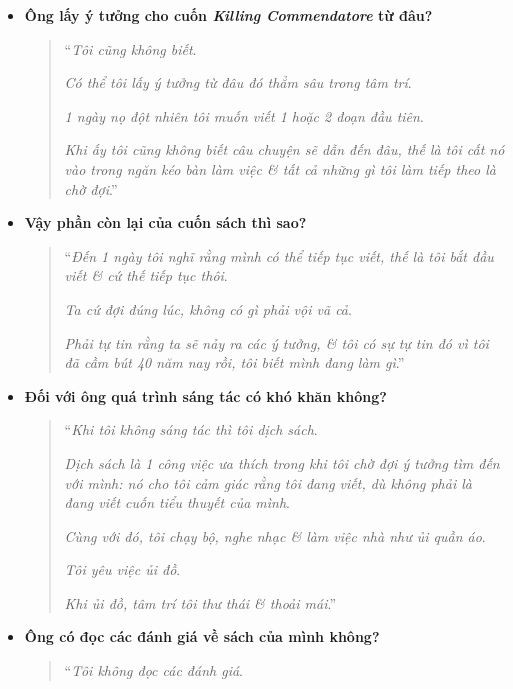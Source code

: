 \documentclass{article}
\begin{document}
\begin{itemize}
	\item \textbf{Ông lấy ý tưởng cho cuốn \textit{Killing Commendatore} từ đâu?}
	
	\begin{quotation}
		``\textit{Tôi cũng không biết}.
		
		\textit{Có thể tôi lấy ý tưởng từ đâu đó thẳm sâu trong tâm trí}.
		
		\textit{1 ngày nọ đột nhiên tôi muốn viết 1 hoặc 2 đoạn đầu tiên}.
		
		\textit{Khi ấy tôi cũng không biết câu chuyện sẽ dẫn đến đâu, thế là tôi cất nó vào trong ngăn kéo bàn làm việc \& tất cả những gì tôi làm tiếp theo là chờ đợi}.''
	\end{quotation}
	
	\item \textbf{Vậy phần còn lại của cuốn sách thì sao?}
	
	\begin{quotation}
		``\textit{Đến 1 ngày tôi nghĩ rằng mình có thể tiếp tục viết, thế là tôi bắt đầu viết \& cứ thế tiếp tục thôi}.
		
		\textit{Ta cứ đợi đúng lúc, không có gì phải vội vã cả}.
		
		\textit{Phải tự tin rằng ta sẽ nảy ra các ý tưởng, \& tôi có sự tự tin đó vì tôi đã cầm bút 40 năm nay rồi, tôi biết mình đang làm gì}.''
	\end{quotation}
	
	\item \textbf{Đối với ông quá trình sáng tác có khó khăn không?}
	\begin{quotation}
		``\textit{Khi tôi không sáng tác thì tôi dịch sách}.
		
		\textit{Dịch sách là 1 công việc ưa thích trong khi tôi chờ đợi ý tưởng tìm đến với mình: nó cho tôi cảm giác rằng tôi đang viết, dù không phải là đang viết cuốn tiểu thuyết của mình}.
		
		\textit{Cùng với đó, tôi chạy bộ, nghe nhạc \& làm việc nhà như ủi quần áo}.
		
		\textit{Tôi yêu việc ủi đồ}.
		
		\textit{Khi ủi đồ, tâm trí tôi thư thái \& thoải mái}.''
	\end{quotation}
	
	\item \textbf{Ông có đọc các đánh giá về sách của mình không?}
	
	\begin{quotation}
		``\textit{Tôi không đọc các đánh giá}.
		

\end{quotation}
\end{itemize}
\end{document}
